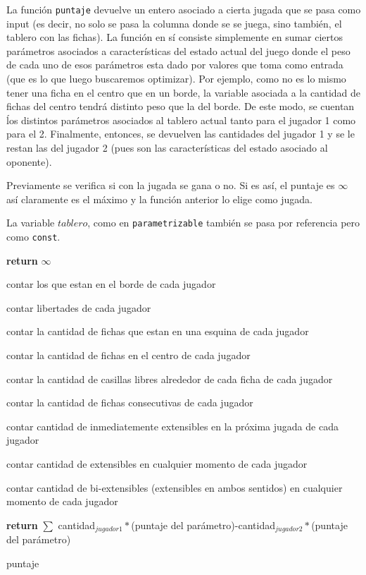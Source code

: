 \documentclass[A4paper,oneside,fleqn,11pt]{article}
\theoremstyle{definition}
\begin{document}
La función \texttt{puntaje} devuelve un entero asociado a cierta jugada que se pasa como input (es decir, no solo se pasa la columna donde se se juega, sino también, el tablero con las fichas). La función en sí consiste simplemente en sumar ciertos parámetros asociados a características del estado actual del juego donde el peso de cada uno de esos parámetros esta dado por valores que toma como entrada (que es lo que luego buscaremos optimizar). Por ejemplo, como no es lo mismo tener una ficha en el centro que en un borde, la variable asociada a la cantidad de fichas del centro tendrá distinto peso que la del borde. De este modo, se cuentan ĺos distintos parámetros asociados al tablero actual tanto para el jugador 1 como para el 2. Finalmente, entonces, se devuelven las cantidades del jugador 1 y se le restan las del jugador 2 (pues son las características del estado asociado al oponente).

Previamente se verifica si con la jugada se gana o no. Si es así, el puntaje es $\infty$ así claramente es el máximo y la función anterior lo elige como jugada.

La variable $tablero$, como en \texttt{parametrizable} también se pasa por referencia pero como \texttt{const}.
\begin{algorithm}


 

			{
			\textbf{return} $\infty$
			}    	

    	contar los que estan en el borde de cada jugador
    	
    	contar libertades de cada jugador

    	contar la cantidad de fichas que estan en una esquina de cada jugador

    	contar la cantidad de fichas en el centro de cada jugador

		contar la cantidad de casillas libres alrededor de cada ficha de cada jugador

		contar la cantidad de fichas consecutivas de cada jugador

		contar cantidad de inmediatemente extensibles en la próxima jugada de cada jugador

		contar cantidad de  extensibles en cualquier momento de cada jugador

		contar cantidad de  bi-extensibles (extensibles en ambos sentidos) en cualquier momento de cada jugador

		\textbf{return} $\sum$ cantidad$_{jugador1}*$(puntaje del parámetro)-cantidad$_{jugador2}*$(puntaje del parámetro)
		
		
    \caption{puntaje}

\end{algorithm}
\end{document}
